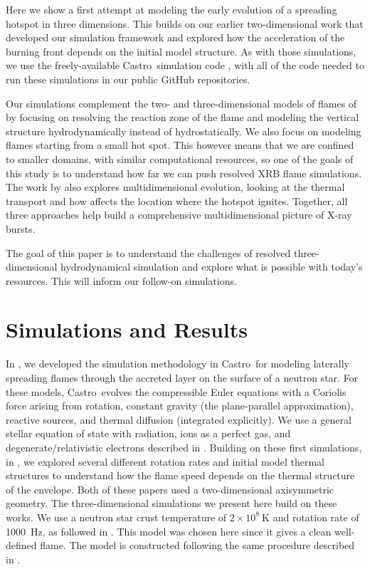 \documentclass[twocolumn,linenumbers,times,tighten]{aastex631}
\newcommand{\castro}{{\sf Castro}}
\begin{document}
Here we show a first attempt at modeling the early evolution of a spreading
hotspot in three dimensions.  This builds on our earlier two-dimensional
work \citep{eiden:2020,harpole:2021} that developed our
simulation framework and explored how the acceleration of the burning
front depends on the initial model structure.  As with those
simulations, we use the freely-available \castro\ simulation code
\citep{castro,castro_joss}, with all of the code needed to run these
simulations in our public GitHub repositories.

Our simulations complement the two- and three-dimensional models of flames of
\citet{cavecchi:2013,art-2015-cavecchi-etal,art-2016-cavecchi-etal,Cavecchi2019}
by focusing on resolving the reaction zone of the flame and modeling
the vertical structure hydrodynamically instead of hydrostatically.
We also focus on modeling flames starting from a small hot spot.  This
however means that we are confined to smaller domains, with similar
computational resources, so one of the goals of this study is to
understand how far we can push resolved XRB flame simulations.  The
work by \citet{goodwin:2021} also explores multidimensional evolution,
looking at the thermal transport and how affects the location where
the hotspot ignites.  Together, all three approaches help build a
comprehensive multidimensional picture of X-ray bursts.

The goal of this paper is to understand the challenges of resolved
three-dimensional hydrodynamical simulation and explore what is
possible with today's resources.  This will inform our follow-on
simulations.

\section{Simulations and Results}\label{Sec:results}

In \citet{eiden:2020}, we developed the simulation methodology in
\castro\ for modeling laterally spreading flames through the accreted
layer on the surface of a neutron star.  For these models,
\castro\ evolves the compressible Euler equations with a Coriolis
force arising from rotation, constant gravity (the plane-parallel
approximation), reactive sources, and thermal diffusion (integrated
explicitly).  We use a general stellar equation of state with
radiation, ions as a perfect gas, and degenerate/relativistic
electrons described in \citet{timmes_swesty:2000}.  Building on these
first simulations, in \citet{harpole:2021}, we explored several
different rotation rates and initial model thermal structures to
understand how the flame speed depends on the thermal structure of the
envelope.  Both of these papers used a two-dimensional axisymmetric
geometry.  The three-dimensional simulations we present here build on
these works.  We use a neutron star crust temperature of $2\times
10^8~\mathrm{K}$ and rotation rate of 1000~Hz, as followed in
\citet{harpole:2021}.  This model was chosen here since it gives a
clean well-defined flame.  The model is constructed following the same
procedure described in \citet{eiden:2020,harpole:2021}.
\end{document}
